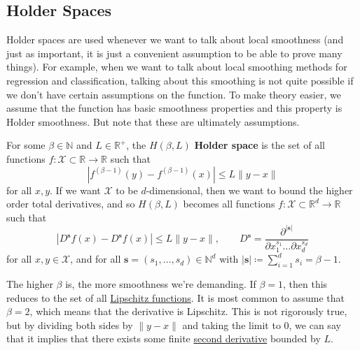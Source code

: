 \subsection{Holder Spaces}

  Holder spaces are used whenever we want to talk about local smoothness (and just as important, it is just a convenient assumption to be able to prove many things). For example, when we want to talk about local smoothing methods for regression and classification, talking about this smoothing is not quite possible if we don't have certain assumptions on the function. To make theory easier, we assume that the function has basic smoothness properties and this property is Holder smoothness. But note that these are ultimately assumptions. 

  \begin{definition}
    \label{def:holder-space}
    For some $\beta \in \mathbb{N}$ and $L \in \mathbb{R}^+$, the $H(\beta, L)$ \textbf{Holder space} is the set of all functions $f: \mathcal{X} \subset \mathbb{R} \rightarrow \mathbb{R}$ such that 
    \begin{equation}
      |f^{(\beta - 1)}(y) - f^{(\beta - 1)}(x)| \leq L \|y - x\|
    \end{equation}
    for all $x, y$. If we want $\mathcal{X}$ to be $d$-dimensional, then we want to bound the higher order total derivatives, and so $H(\beta, L)$ becomes all functions $f: \mathcal{X} \subset \mathbb{R}^d \rightarrow \mathbb{R}$ such that 
    \begin{equation}
      |D^{\mathbf{s}} f(x) - D^{\mathbf{s}} f(x)| \leq L \|y - x\|, \qquad D^{\mathbf{s}} = \frac{\partial^{|\mathbf{s}|}}{\partial x_1^{s_1} \ldots \partial x_d^{s_d}} 
    \end{equation}
    for all $x, y \in \mathcal{X}$, and for all $\mathbf{s} = (s_1, \ldots, s_d) \in \mathbb{N}^d$ with $|\mathbf{s}| \coloneqq \sum_{i=1}^d s_i = \beta - 1$. 
  \end{definition}

  The higher $\beta$ is, the more smoothness we're demanding. If $\beta = 1$, then this reduces to the set of all \hyperref[com-def:lipschitz-function]{Lipschitz functions}. It is most common to assume that $\beta = 2$, which means that the derivative is Lipschitz. This is not rigorously true, but by dividing both sides by $\|y - x\|$ and taking the limit to $0$, we can say that it implies that there exists some finite \hyperref[mv-def:second-derivative]{second derivative} bounded by $L$. 

